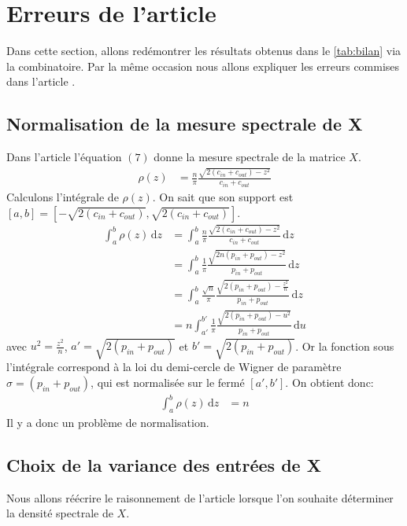 \section{Erreurs de l'article}
Dans cette section, allons redémontrer les résultats obtenus dans le \autoref{tab:bilan} via la combinatoire.
Par la même occasion nous allons expliquer les erreurs commises dans l'article \cite[Graph spectra and the detectability of community structure in networks]{raj_rao}.
\subsection{Normalisation de la mesure spectrale de X}
Dans l'article l'équation $(7)$ donne la mesure spectrale de la matrice $X$.
\begin{align*}
	\rho(z) &= \frac{n}{\pi} \frac{\sqrt{2(c_{in} + c_{out}) - z^2}}{c_{in} + c_{out}}
\end{align*}
Calculons l'intégrale de $\rho(z)$. 
On sait que son support est $[a, b] = [-\sqrt{2(c_{in} + c_{out})},\sqrt{2(c_{in} + c_{out})}]$.
\begin{align*}
	\int_{a}^{b} \rho(z) \, \mathrm{d}z &= \int_{a}^{b} \frac{n}{\pi} \frac{\sqrt{2(c_{in} + c_{out}) - z^2}}{c_{in} + c_{out}}  \, \mathrm{d}z \\
	&= \int_{a}^{b} \frac{1}{\pi} \frac{\sqrt{2 n (p_{in} + p_{out}) - z^2}}{p_{in} + p_{out}}  \, \mathrm{d}z \\
	&= \int_{a}^{b} \frac{\sqrt{n}}{\pi} \frac{\sqrt{2 (p_{in} + p_{out}) - \frac{z^2}{n}}}{p_{in} + p_{out}}  \, \mathrm{d}z  \\
	&= n \int_{a'}^{b'} \frac{1}{\pi} \frac{\sqrt{2 (p_{in} + p_{out}) - u^2}}{p_{in} + p_{out}}  \, \mathrm{d}u  
\end{align*}
avec $u^2 = \frac{z^2}{n}$, $a'= \sqrt{2(p_{in} + p_{out})}$ et $b'= \sqrt{2(p_{in} + p_{out})}$.
Or la fonction sous l’intégrale correspond à la loi du demi-cercle de Wigner de paramètre $\sigma = (p_{in} + p_{out})$, qui est normalisée sur le fermé $[a', b']$.
On obtient donc:
\begin{align*}
 	\int_{a}^{b} \rho(z) \, \mathrm{d}z &= n
\end{align*}
Il y a donc un problème de normalisation.

\subsection{Choix de la variance des entrées de X}
Nous allons réécrire le raisonnement de l'article \cite[Graph spectra and the detectability of community structure in networks]{raj_rao} lorsque l'on souhaite déterminer la densité spectrale de $X$.\\

